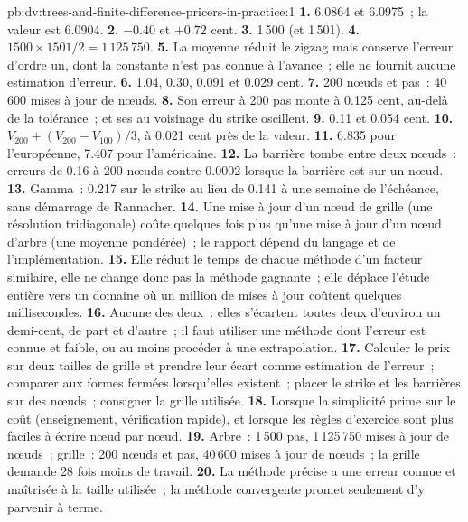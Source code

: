 \begin{solution}{pb:dv:trees-and-finite-difference-pricers-in-practice:1}
\textbf{1.} 6.0864 et 6.0975~; la valeur est 6.0904.
\textbf{2.} $-0.40$ et $+0.72$ cent.
\textbf{3.} 1\,500 (et 1\,501).
\textbf{4.} $1500\times1501/2=1\,125\,750$.
\textbf{5.} La moyenne réduit le zigzag mais conserve l'erreur d'ordre un, dont la constante n'est pas connue à l'avance~; elle ne fournit aucune estimation d'erreur.
\textbf{6.} 1.04, 0.30, 0.091 et 0.029 cent.
\textbf{7.} 200 nœuds et pas~: 40\,600 mises à jour de nœuds.
\textbf{8.} Son erreur à 200 pas monte à 0.125 cent, au-delà de la tolérance~; et ses  au voisinage du strike oscillent.
\textbf{9.} 0.11 et 0.054 cent.
\textbf{10.} $V_{200}+(V_{200}-V_{100})/3$, à 0.021 cent près de la valeur.
\textbf{11.} 6.835 pour l'européenne, 7.407 pour l'américaine.
\textbf{12.} La barrière tombe entre deux nœuds~: erreurs de 0.16 à 200 nœuds contre 0.0002 lorsque la barrière est sur un nœud.
\textbf{13.} Gamma~: 0.217 sur le strike au lieu de 0.141 à une semaine de l'échéance, sans démarrage de Rannacher.
\textbf{14.} Une mise à jour d'un nœud de grille (une résolution tridiagonale) coûte quelques fois plus qu'une mise à jour d'un nœud d'arbre (une moyenne pondérée)~; le rapport dépend du langage et de
l'implémentation.
\textbf{15.} Elle réduit le temps de chaque méthode d'un facteur similaire, elle ne change donc pas la méthode gagnante~; elle déplace l'étude entière vers un domaine où un million de
mises à jour coûtent quelques millisecondes.
\textbf{16.} Aucune des deux~: elles s'écartent toutes deux d'environ un demi-cent, de part et d'autre~; il faut utiliser une méthode dont l'erreur est connue et faible, ou au moins procéder à une extrapolation.
\textbf{17.} Calculer le prix sur deux tailles de grille et prendre leur écart comme estimation de l'erreur~; comparer aux formes fermées lorsqu'elles existent~; placer le strike et
les barrières sur des nœuds~; consigner la grille utilisée.
\textbf{18.} Lorsque la simplicité prime sur le coût (enseignement, vérification rapide), et lorsque les règles d'exercice sont plus faciles à écrire nœud par nœud.
\textbf{19.} Arbre~: 1\,500 pas, 1\,125\,750 mises à jour de nœuds~; grille~: 200 nœuds et pas, 40\,600 mises à jour de nœuds~; la grille demande 28 fois moins de travail.
\textbf{20.} La méthode précise a une erreur connue et maîtrisée à la taille utilisée~; la méthode convergente promet seulement d'y parvenir à terme.
\end{solution}

